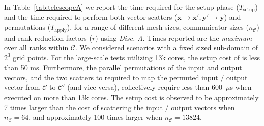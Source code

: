 \documentclass[]{siamart0216}
\newcommand{\dvec}[1]{\mathbf{#1}}
\begin{document}
In Table~\ref{tab:telescopeA} we report the time required for the setup phase ($T_\text{setup}$) and the time required to perform both 
vector scatters ($\dvec x \rightarrow \dvec x', \dvec y' \rightarrow \dvec y$) and permutations ($T_\text{apply}$), for a range of 
different mesh sizes, communicator sizes ($n_{\mathcal C}$) and rank reduction factors ($r$) using \emph{Disc. A}.
Times reported are the \textit{maximum} over all ranks within $\mathcal C$.
We considered scenarios with a fixed sized sub-domain of $2^3$ grid points. 
For the large-scale tests utilizing 13k cores, the setup cost of  is less than 50 ms.
Furthermore, the parallel permutations of the input and output vectors, and the 
two scatters to required to map the permuted input / output vector from $\mathcal C$ to $\mathcal C'$ (and vice versa), 
collectively require less than 600~$\mu$s when executed on more than 13k cores.
The setup cost is observed to be approximately 7 times larger than the cost of scattering the input / output vectors 
when $n_{\mathcal C} = 64$, and approximately 100 times larger when $n_{\mathcal C} = 13824$.
\end{document}
